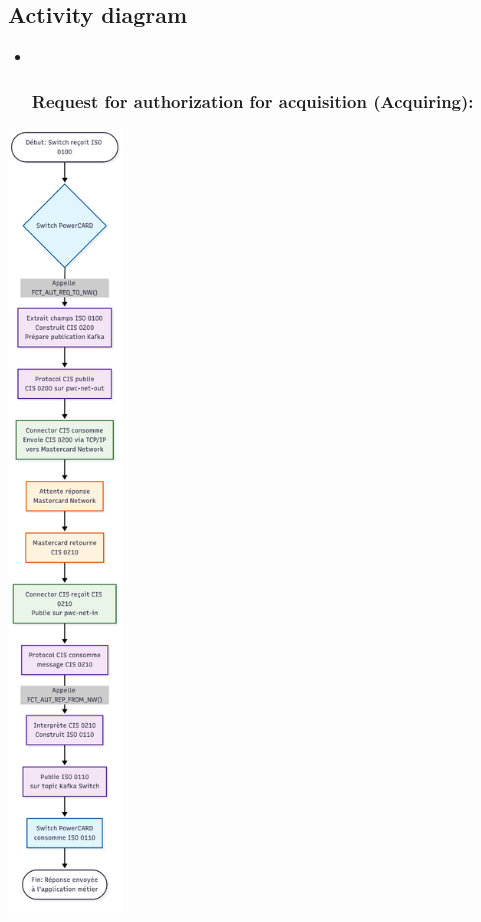 \documentclass[12pt,a4paper]{report}
\begin{document}
\hypertarget{activity-diagram}{%
\subsection{\texorpdfstring{\textbf{Activity
diagram}}{Activity diagram}}\label{activity-diagram}}

\begin{itemize}
\item ~
  \hypertarget{request-for-authorization-for-acquisition-acquiring}{%
  \subsubsection{\texorpdfstring{\textbf{Request for authorization for
  acquisition
  (Acquiring):}}{Request for authorization for acquisition (Acquiring):}}\label{request-for-authorization-for-acquisition-acquiring}}
\end{itemize}

\includegraphics[width=1.20065in,height=8.1761in]{vertopal_d1b0b2209edd4c6aa8254f57daa0953b/media/image44.png}
\end{document}
